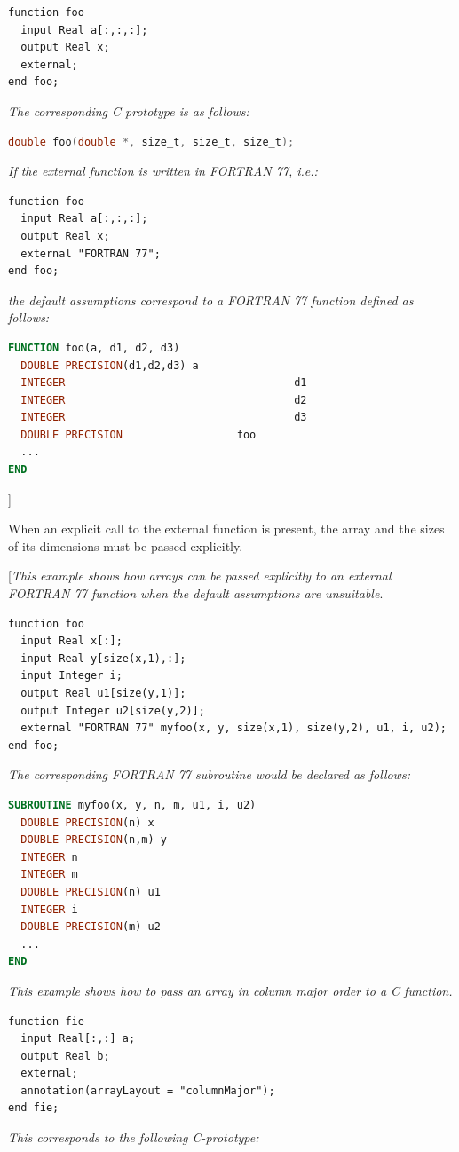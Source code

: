 \documentclass[10pt,a4paper]{report}
\begin{document}
\begin{lstlisting}[language=modelica]
function foo
  input Real a[:,:,:];
  output Real x;
  external;
end foo;
\end{lstlisting}
\emph{The corresponding C prototype is as follows:}
\begin{lstlisting}[language=C]
double foo(double *, size_t, size_t, size_t);
\end{lstlisting}

\emph{If the external function is written in FORTRAN 77, i.e.:}

\begin{lstlisting}[language=modelica]
function foo
  input Real a[:,:,:];
  output Real x;
  external "FORTRAN 77";
end foo;
\end{lstlisting}
\emph{the default assumptions correspond to a FORTRAN 77 function
defined as follows:}
\begin{lstlisting}[language=fortran]
FUNCTION foo(a, d1, d2, d3)
  DOUBLE PRECISION(d1,d2,d3) a
  INTEGER                                    d1
  INTEGER                                    d2
  INTEGER                                    d3
  DOUBLE PRECISION                  foo
  ...
END
\end{lstlisting}
{]}

When an explicit call to the external function is present, the array and
the sizes of its dimensions must be passed explicitly.

{[}\emph{This example shows how arrays can be passed explicitly to an
external FORTRAN 77 function when the default assumptions are
unsuitable}.

\begin{lstlisting}[language=modelica]
function foo
  input Real x[:];
  input Real y[size(x,1),:];
  input Integer i;
  output Real u1[size(y,1)];
  output Integer u2[size(y,2)];
  external "FORTRAN 77" myfoo(x, y, size(x,1), size(y,2), u1, i, u2);
end foo;
\end{lstlisting}
\emph{The corresponding FORTRAN 77 subroutine would be declared as
follows: }
\begin{lstlisting}[language=fortran]
SUBROUTINE myfoo(x, y, n, m, u1, i, u2)
  DOUBLE PRECISION(n) x
  DOUBLE PRECISION(n,m) y
  INTEGER n
  INTEGER m
  DOUBLE PRECISION(n) u1
  INTEGER i
  DOUBLE PRECISION(m) u2
  ...
END
\end{lstlisting}

\emph{This example shows how to pass an array in column major order to a
C function.}

\begin{lstlisting}[language=modelica]
function fie
  input Real[:,:] a;
  output Real b;
  external;
  annotation(arrayLayout = "columnMajor");
end fie;
\end{lstlisting}
\emph{This corresponds to the following C-prototype:}
\end{document}
